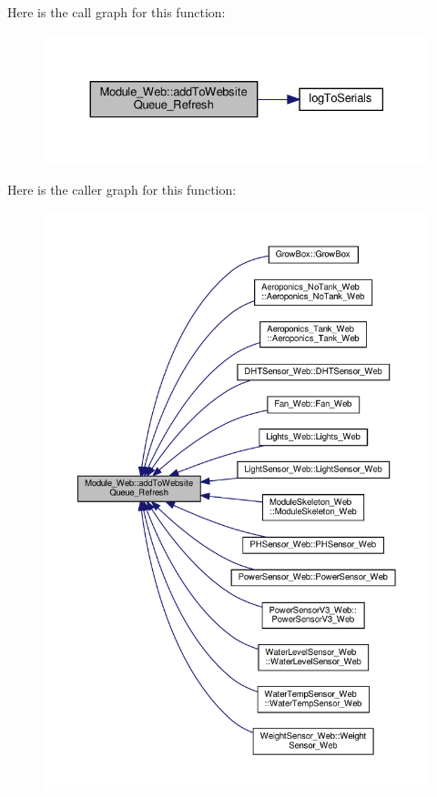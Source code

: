 Here is the call graph for this function\+:
\nopagebreak
\begin{figure}[H]
\begin{center}
\leavevmode
\includegraphics[width=330pt]{class_module___web_aee7880f65926af22ba1b83a73607e3b6_cgraph}
\end{center}
\end{figure}
Here is the caller graph for this function\+:
\nopagebreak
\begin{figure}[H]
\begin{center}
\leavevmode
\includegraphics[width=350pt]{class_module___web_aee7880f65926af22ba1b83a73607e3b6_icgraph}
\end{center}
\end{figure}
\mbox{\label{class_module___web_aee7880f65926af22ba1b83a73607e3b6}} 
